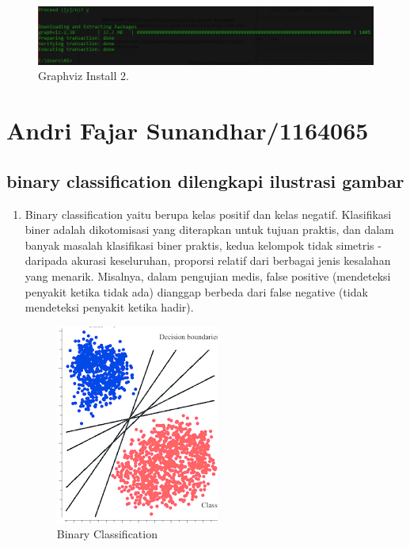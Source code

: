 \begin{enumerate}
	\begin{figure}[ht]
		\centerline{\includegraphics[width=1\textwidth]{figures/YN/YNGraphvizInstall2.png}}
		\caption{Graphviz Install 2.}
		\label{YNInstall2}
	\end{figure}

\end{enumerate}


 \section{Andri Fajar Sunandhar/1164065}
\subsection{binary classification dilengkapi ilustrasi gambar}
\begin{enumerate}
\item Binary classification yaitu berupa kelas positif dan kelas negatif. Klasifikasi biner adalah dikotomisasi yang diterapkan untuk tujuan praktis, dan dalam banyak masalah klasifikasi biner praktis, kedua kelompok tidak simetris - daripada akurasi keseluruhan, proporsi relatif dari berbagai jenis kesalahan yang menarik. Misalnya, dalam pengujian medis, false positive (mendeteksi penyakit ketika tidak ada) dianggap berbeda dari false negative (tidak mendeteksi penyakit ketika hadir).
\begin{figure}[ht]
\centering
\includegraphics[scale=0.5]{figures/AFS/andri1.png}
\caption{Binary Classification}
\label{contoh}
\end{figure}
\end{enumerate}


